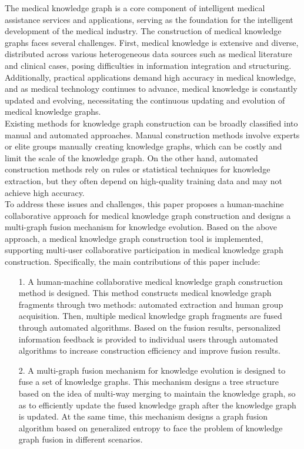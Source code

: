 \begin{eabstract}
The medical knowledge graph is a core component of intelligent medical assistance services and applications, serving as the foundation for the intelligent development of the medical industry. The construction of medical knowledge graphs faces several challenges. First, medical knowledge is extensive and diverse, distributed across various heterogeneous data sources such as medical literature and clinical cases, posing difficulties in information integration and structuring. Additionally, practical applications demand high accuracy in medical knowledge, and as medical technology continues to advance, medical knowledge is constantly updated and evolving, necessitating the continuous updating and evolution of medical knowledge graphs.\\
\indent Existing methods for knowledge graph construction can be broadly classified into manual and automated approaches. Manual construction methods involve experts or elite groups manually creating knowledge graphs, which can be costly and limit the scale of the knowledge graph. On the other hand, automated construction methods rely on rules or statistical techniques for knowledge extraction, but they often depend on high-quality training data and may not achieve high accuracy.\\
\indent To address these issues and challenges, this paper proposes a human-machine collaborative approach for medical knowledge graph construction and designs a multi-graph fusion mechanism for knowledge evolution. Based on the above approach, a medical knowledge graph construction tool is implemented, supporting multi-user collaborative participation in medical knowledge graph construction. Specifically, the main contributions of this paper include:
\begin{itemize}
    \item[1.] A human-machine collaborative medical knowledge graph construction method is designed. This method constructs medical knowledge graph fragments through two methods: automated extraction and human group acquisition. Then, multiple medical knowledge graph fragments are fused through automated algorithms. Based on the fusion results, personalized information feedback is provided to individual users through automated algorithms to increase construction efficiency and improve fusion results.
    \item[2.] A multi-graph fusion mechanism for knowledge evolution is designed to fuse a set of knowledge graphs. This mechanism designs a tree structure based on the idea of multi-way merging to maintain the knowledge graph, so as to efficiently update the fused knowledge graph after the knowledge graph is updated. At the same time, this mechanism designs a graph fusion algorithm based on generalized entropy to face the problem of knowledge graph fusion in different scenarios.

\end{itemize}
\end{eabstract}
